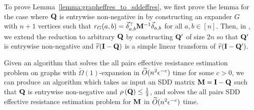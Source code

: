 To prove Lemma~\ref{lemma:grapheffres_to_sddeffres}, we first prove the lemma for the case where $\mathbf{Q}$ is entrywise non-negative in  by constructing an expander $G$ with $n+1$ vertices such that $r_{G}(a, b) = \vec{\delta}_{a,b}^\top \mathbf{M}^{-1}\vec{\delta}_{a,b}$ for all $a, b \in [n]$. Then, in , we extend the reduction to arbitrary $\mathbf{Q}$ by constructing $\mathbf{Q}'$ of size $2n$ so that $\mathbf{Q}'$ is entrywise non-negative and $\widetilde{r}(\mathbf{I} - \mathbf{Q})$ is a simple linear transform of $\widetilde{r}(\mathbf{I} - \mathbf{Q}')$. 

\begin{lemma}\label{lemma:lowerbound_thm2_lemma1} Given an algorithm that solves the all pairs effective resistance estimation problem on graphs with $\widetilde{\Omega}(1)$-expansion in $\widetilde{O}( {n^2\epsilon^{-c}} )$ time for some $c > 0$, we can produce an algorithm which takes as input an SDD matrix $\mathbf{M} = \mathbf{I} - \mathbf{Q}$ such that $\mathbf{Q}$ is entrywise non-negative and $\rho\left( \mathbf{Q} \right) \leq \frac{1}{3}$, and solves the all pairs SDD effective resistance estimation problem for $\mathbf{M}$ in $\widetilde{O}( {n^2 \epsilon^{-c}} )$ time.
\end{lemma}

